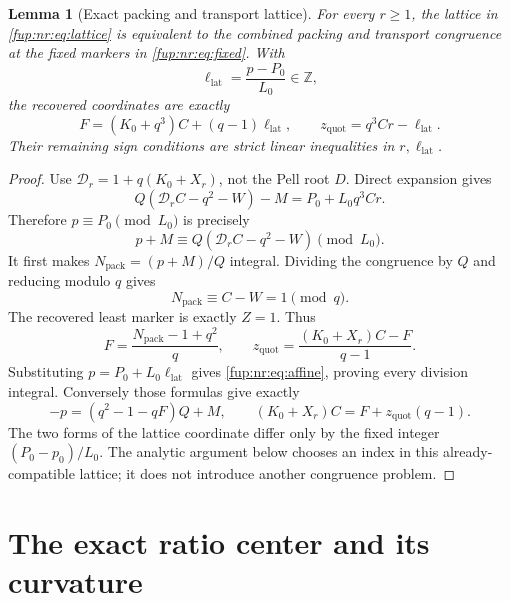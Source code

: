 \documentclass[11pt,letterpaper]{article}
\newtheorem{lemma}[theorem]{Lemma}
\theoremstyle{definition}\newtheorem{definition}[theorem]{Definition}
\theoremstyle{remark}\newtheorem{remark}[theorem]{Remark}
\newcommand{\Z}{\mathbb Z}\newcommand{\Np}{\mathbb Z_{>0}}
\newcommand{\zquot}{z_{\mathrm{quot}}}\newcommand{\ga}{g_a}
\begin{document}
\begin{lemma}[Exact packing and transport lattice]\label{fup:nr:lem:lattice}
For every $r\ge1$, the lattice in \eqref{fup:nr:eq:lattice} is equivalent to the combined packing and transport congruence at the fixed markers in \eqref{fup:nr:eq:fixed}. With
\[
 \ell_{\mathrm{lat}}=\frac{p-P_0}{L_0}\in\Z,
\]
the recovered coordinates are exactly
\begin{equation}\label{fup:nr:eq:affine}
 F=(K_0+q^3)C+(q-1)\ell_{\mathrm{lat}},\qquad
 \zquot=q^3Cr-\ell_{\mathrm{lat}}.
\end{equation}
Their remaining sign conditions are strict linear inequalities in $r,\ell_{\mathrm{lat}}$.
\end{lemma}
\begin{proof}
Use $\mathcal D_r=1+q(K_0+X_r)$, not the Pell root $D$. Direct expansion gives
\begin{equation}\label{fup:nr:eq:latticediff}
 Q(\mathcal D_rC-q^2-W)-M=P_0+L_0q^3Cr.
\end{equation}
Therefore $p\equiv P_0\pmod{L_0}$ is precisely
\begin{equation}\label{fup:nr:eq:outercong}
 p+M\equiv Q(\mathcal D_rC-q^2-W)\pmod{L_0}.
\end{equation}
It first makes $N_{\mathrm{pack}}=(p+M)/Q$ integral. Dividing the congruence by $Q$ and reducing modulo $q$ gives
\[
 N_{\mathrm{pack}}\equiv C-W=1\pmod q.
\]
The recovered least marker is exactly $Z=1$. Thus
\[
 F=\frac{N_{\mathrm{pack}}-1+q^2}{q},\qquad
 \zquot=\frac{(K_0+X_r)C-F}{q-1}.
\]
Substituting $p=P_0+L_0\ell_{\mathrm{lat}}$ gives \eqref{fup:nr:eq:affine}, proving every division integral. Conversely those formulas give exactly
\begin{equation}\label{fup:nr:eq:outeridentities}
 -p=(q^2-1-qF)Q+M,\qquad (K_0+X_r)C=F+\zquot(q-1).
\end{equation}
The two forms of the lattice coordinate differ only by the fixed integer $(P_0-p_0)/L_0$. The analytic argument below chooses an index in this already-compatible lattice; it does not introduce another congruence problem.
\end{proof}

\section{The exact ratio center and its curvature}\label{fup:nr:sec:curvature}
\end{document}
